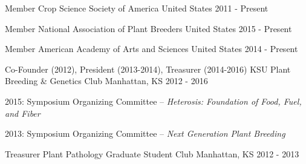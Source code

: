 
\begin{cventries}

  \cventry
    {Member} %
    {Crop Science Society of America} %
    {United States} %
    {2011 - Present} %
    {}

  \cventry
    {Member} %
    {National Association of Plant Breeders} %
    {United States} %
    {2015 - Present} %
    {}

  \cventry
    {Member} %
    {American Academy of Arts and Sciences} %
    {United States} %
    {2014 - Present} %
    {}

  \cventry
    {Co-Founder (2012), President (2013-2014), Treasurer (2014-2016)} %
    {KSU Plant Breeding \& Genetics Club} %
    {Manhattan, KS} %
    {2012 - 2016} %
    {
      \begin{cvitems} %
        \item {2015: Symposium Organizing Committee – \textit{Heterosis: Foundation of Food, Fuel, and Fiber}}
        \item {2013: Symposium Organizing Committee – \textit{Next Generation Plant Breeding}}
      \end{cvitems}
    }

  \cventry
    {Treasurer} %
    {Plant Pathology Graduate Student Club } %
    {Manhattan, KS} %
    {2012 - 2013} %
    {}
\end{cventries}
